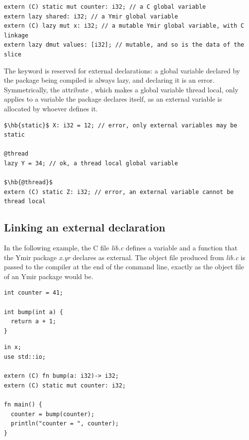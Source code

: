 \begin{lstlisting}[style=coloredverbatim]
extern (C) static mut counter: i32; // a C global variable
extern lazy shared: i32; // a Ymir global variable
extern (C) lazy mut x: i32; // a mutable Ymir global variable, with C linkage
extern lazy dmut values: [i32]; // mutable, and so is the data of the slice
\end{lstlisting}

The keyword  is reserved for external declarations: a global
variable declared by the package being compiled is always lazy, and declaring it
 is an error. Symmetrically, the attribute , which
makes a global variable thread local, only applies to a variable the package
declares itself, as an external variable is allocated by whoever defines it.

\begin{lstlisting}[style=coloredverbatimError, escapechar=$]
$\hb{static}$ X: i32 = 12; // error, only external variables may be static

@thread
lazy Y = 34; // ok, a thread local global variable

$\hb{@thread}$
extern (C) static Z: i32; // error, an external variable cannot be thread local
\end{lstlisting}

\subsection{Linking an external declaration}

In the following example, the C file \textit{lib.c} defines a variable and a
function that the Ymir package \textit{x.yr} declares as external. The object
file produced from \textit{lib.c} is passed to the compiler at the end of the
command line, exactly as the object file of an Ymir package would be.

\begin{minipage}[t][][t]{0.35\linewidth}
\begin{lstlisting}[caption=\textit{lib.c}, style=cVerb]
int counter = 41;

int bump(int a) {
  return a + 1;
}
\end{lstlisting}
\end{minipage}\hspace{5pt}%
\begin{minipage}[t][][t]{0.6\linewidth}
\begin{lstlisting}[caption=\textit{x.yr}, style=coloredverbatim]
in x;
use std::io;

extern (C) fn bump(a: i32)-> i32;
extern (C) static mut counter: i32;

fn main() {
  counter = bump(counter);
  println("counter = ", counter);
}
\end{lstlisting}
\end{minipage}

